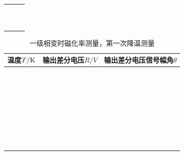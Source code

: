\documentclass[11pt,a4paper]{ctexart}
\begin{document}
\begin{enumerate}
\begin{table}[H]
\begin{tabular}{|p{32mm}|p{32mm}|p{32mm}|}
     &  &\\ \hline
  &  &\\ \hline
  &  &\\ \hline
  &  &\\ \hline
  &  &\\ \hline
  &  &\\ \hline
  &  &\\ \hline
  &  &\\ \hline
    & &\\ \hline
  & &\\ \hline
   & &\\ \hline
  \end{tabular}
  \end{table}
    \begin{table}[H]
\centering
\caption{一级相变时磁化率测量，第一次降温测量\label{tablez2}}
\begin{tabular}{|p{32mm}|p{32mm}|p{32mm}|}
\hline
温度$T/{\rm K}$ & 输出差分电压$R/{V}$ & 输出差分电压信号幅角$\theta$ \\ \hline
 & & \\ \hline
  & & \\ \hline
  & & \\ \hline
   & & \\ \hline
    & & \\ \hline
 & & \\ \hline
  &  &\\ \hline
  &  &\\ \hline
  &  &\\ \hline
  &  &\\ \hline
  &  &\\ \hline
  &  &\\ \hline
  &  &\\ \hline
  &  &\\ \hline
  &  &\\ \hline
  &  &\\ \hline
  &  &\\ \hline
  &  &\\ \hline
    & &\\ \hline
  & &\\ \hline
   & &\\ \hline
     &  &\\ \hline
  &  &\\ \hline
  &  &\\ \hline
  &  &\\ \hline
  &  &\\ \hline
  &  &\\ \hline
  &  &\\ \hline
  &  &\\ \hline
    & &\\ \hline
  & &\\ \hline
   & &\\ \hline
  \end{tabular}
  \end{table}
  

\end{enumerate}
\end{document}
